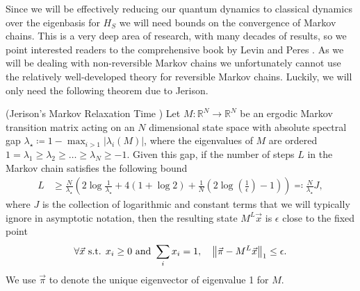 Since we will be effectively reducing our quantum dynamics to classical dynamics over the eigenbasis for $H_S$ we will need bounds on the convergence of Markov chains. This is a very deep area of research, with many decades of results, so we point interested readers to the comprehensive book by Levin and Peres \cite{levin2017markov}. As we will be dealing with non-reversible Markov chains we unfortunately cannot use the relatively well-developed theory for reversible Markov chains. Luckily, we will only need the following theorem due to Jerison.
\begin{theorem}(Jerison's Markov Relaxation Time \cite{jerison2013general}) \label{thm:markov_chain_bound}
    Let $M : \mathbb{R}^{N} \to  \mathbb{R}^{N}$ be an ergodic Markov transition matrix acting on an $N$ dimensional state space with absolute spectral gap $\lambda_{\star} \coloneqq 1 - \max_{i > 1} |\lambda_i(M)|$, where the eigenvalues of $M$ are ordered $1 = \lambda_1 \ge \lambda_2 \ge \ldots \ge \lambda_N \geq -1$. Given this gap, if the number of steps $L$ in the Markov chain satisfies the following bound
    \begin{align}
        L &\ge \frac{N}{\lambda_{\star}} \left( 2\log \frac{1}{\lambda_{\star}} + 4(1 + \log 2) +  \frac{1}{N} (2 \log \left( \frac{1}{\epsilon} \right) - 1) \right) \eqqcolon \frac{N}{\lambda_\star} J,
    \end{align}
    where $J$ is the collection of logarithmic and constant terms that we will typically ignore in asymptotic notation, then the resulting state $M^L \vec{x}$ is $\epsilon$ close to the fixed point
    \begin{equation}
        \forall \vec{x} \text{ s.t. } x_i \ge 0 \text{ and } \sum_i x_i = 1, \quad \norm{\vec{\pi} - M^L \vec{x}}_1 \le \epsilon.
    \end{equation}
    We use $\vec{\pi}$ to denote the unique eigenvector of eigenvalue 1 for $M$.
\end{theorem}

